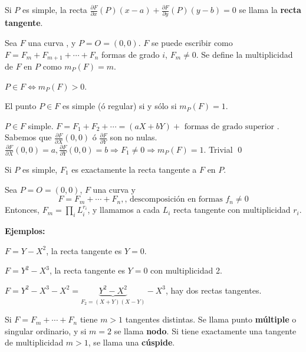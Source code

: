 \begin{Def}
Si $P$ es simple, la recta $\frac{\partial F}{\partial x}(P)(x -a)+ \frac{\partial F}{\partial y}(P)(y-b)=0$ se llama la \textbf{recta tangente}. 
\end{Def}


\begin{Def}
Sea $F$ una curva , y $P=O=(0,0)$. $F$ se puede escribir como $F=F_m+F_{m+1}+\cdots + F_n$ formas de grado $i$, $F_m\neq 0$. Se define la multiplicidad de $F$ en $P$ como $m_P(F)=m$. 
\end{Def}

\begin{nota}
$P\in F \Leftrightarrow m_P(F)>0$. 
\end{nota}

\begin{nota}
El punto $P\in F$ es simple (ó regular) si y sólo si $m_P(F)=1$. 
\begin{Dem}
\framebox{$\Rightarrow $} $P\in F$ simple. $F=F_1+F_2+\cdots = (aX+bY)+ \text{ formas de grado superior }$. Sabemos que $\frac{\partial F}{\partial X}(0,0)$ ó $\frac{\partial F}{\partial Y}$ son no nulas. $\frac{\partial F}{\partial X} (0,0) = a, \frac{\partial F}{\partial Y}(0,0)=b \Rightarrow F_1\neq 0 \Rightarrow m_P(F)=1$. 
\framebox{$\Leftrightarrow $} Trivial \qed
\end{Dem}
\end{nota}


Si $P$ es simple, $F_1$ es exactamente la recta tangente a $F$ en $P$. 


\begin{Def}
Sea $P=O=(0,0)$, $F$ una curva y 
$$F=F_m+\cdots +F_n, \text{, descomposición en formas } f_n\neq 0$$
Entonces, $F_m= \prod_i L_i^{r_i}$, y llamamos a cada $L_i$ recta tangente con multiplicidad $r_i$. 
\end{Def}

\textbf{Ejemplos: }
\begin{itemize*}
\item $F=Y-X^2$, la recta tangente es $Y=0$. 
\item $F=Y^2-X^3$, la recta tangente es $Y=0$ con multiplicidad 2. 
\item $F= Y^2-X^3-X^2= \underbrace{Y^2-X^2}_{F_2=(X+Y)(X-Y)}-X^3$, hay dos rectas tangentes. 
\end{itemize*}


\begin{Def}
Si $F=F_m+\cdots + F_n$ tiene $m>1$ tangentes distintas. Se llama punto \textbf{múltiple} o singular ordinario, y si $m=2$ se llama \textbf{nodo}. Si tiene exactamente una tangente de multiplicidad $m>1$, se llama una \textbf{cúspide}. 
\end{Def}

